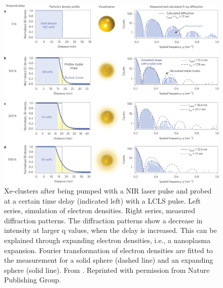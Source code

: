 \begin{figure}
	\centering
		\includegraphics[width=1.00\textwidth]{images/tais-nat-photonics.jpg}
	\caption[Measurement and simulation of the nanoplasma expansion in Xe-clusters.]{Xe-clusters after being pumped with a NIR laser pulse and probed at a certain time delay (indicated left) with a LCLS pulse. Left series, simulation of electron densities. Right series, measured diffraction patterns. The diffraction patterns show a decrease in intensity at larger q values, when the delay is increased. This can be explained through expanding electron densities, i.e., a nanoplasma expansion. Fourier transformation of electron densities are fitted to the measurement for a solid sphere (dashed line) and an expanding sphere (solid line). From \citep{Gorkhover-2016-NatPho}. Reprinted with permission from Nature Publishing Group.}
	\label{fig:tais-nat-photonics}
\end{figure}
